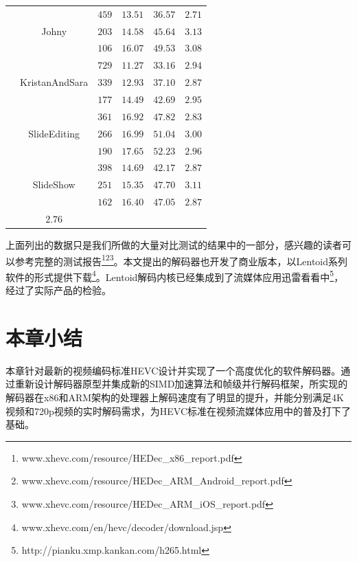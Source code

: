 \begin{table}
\begin{center}
\begin{tabular}{c|c|c|c|c|c}
			& \multirow{3}{*}{Johny} &
			$459$ & $13.51$ & $36.57$ & $2.71$ \\
			\cline{3-6}
			& & $203$ & $14.58$ & $45.64$ & $3.13$ \\
			\cline{3-6}
			& & $106$ & $16.07$ & $49.53$ & $3.08$ \\
			\cline{2-6}
			& \multirow{3}{*}{KristanAndSara} &
			$729$ & $11.27$ & $33.16$ & $2.94$ \\
			\cline{3-6}
			& & $339$ & $12.93$ & $37.10$ & $2.87$ \\
			\cline{3-6}
			& & $177$ & $14.49$ & $42.69$ & $2.95$ \\
			\cline{2-6}
			& \multirow{3}{*}{SlideEditing} &
			$361$ & $16.92$ & $47.82$ & $2.83$ \\
			\cline{3-6}
			& & $266$ & $16.99$ & $51.04$ & $3.00$ \\
			\cline{3-6}
			& & $190$ & $17.65$ & $52.23$ & $2.96$ \\
			\cline{2-6}
			& \multirow{3}{*}{SlideShow} &
			$398$ & $14.69$ & $42.17$ & $2.87$ \\
			\cline{3-6}
			& & $251$ & $15.35$ & $47.70$ & $3.11$ \\
			\cline{3-6}
			& & $162$ & $16.40$ & $47.05$ & $2.87$ \\
			\hline
			\rowcolor[gray]{.9}
			\multicolumn{5}{>{\columncolor[gray]{.9}}c|}{平均加速比} & $2.76$ \\
			\hline
		\end{tabular}
	\end{center}
\end{table}

上面列出的数据只是我们所做的大量对比测试的结果中的一部分，感兴趣的读者可以参考完整的测试报告\footnote{www.xhevc.com/resource/HEDec\_x86\_report.pdf}\footnote{www.xhevc.com/resource/HEDec\_ARM\_Android\_report.pdf}\footnote{www.xhevc.com/resource/HEDec\_ARM\_iOS\_report.pdf}。本文提出的解码器也开发了商业版本，以Lentoid系列软件的形式提供下载\footnote{www.xhevc.com/en/hevc/decoder/download.jsp}。Lentoid解码内核已经集成到了流媒体应用迅雷看看中\footnote{http://pianku.xmp.kankan.com/h265.html}，经过了实际产品的检验。

\section{本章小结}

本章针对最新的视频编码标准HEVC设计并实现了一个高度优化的软件解码器。通过重新设计解码器原型并集成新的SIMD加速算法和帧级并行解码框架，所实现的解码器在x86和ARM架构的处理器上解码速度有了明显的提升，并能分别满足4K视频和720p视频的实时解码需求，为HEVC标准在视频流媒体应用中的普及打下了基础。